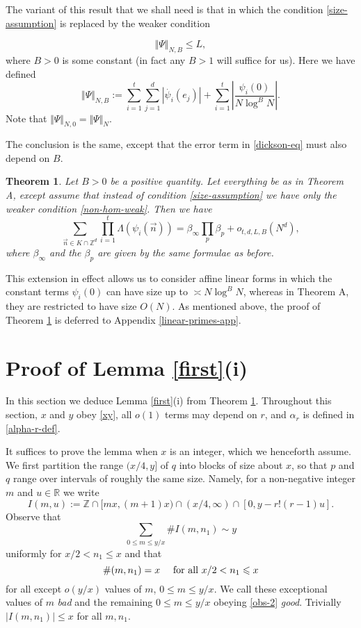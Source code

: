 \documentclass[12pt]{amsart}
\numberwithin{equation}{section}  %
\theoremstyle{remark}
\theoremstyle{plain}
\newtheorem{thm}{Theorem}
\numberwithin{equation}{section}
\newcommand{\Z}{\mathbb{Z}}
\newcommand{\R}{\mathbb{R}}
\renewcommand{\le}{\leqslant}
\renewcommand{\leq}{\leqslant}
\renewcommand{\(}{\left(}
\renewcommand{\)}{\right)}
\newcommand{\asym}{\sim}   %
\newcommand{\vect}[1]{{\ensuremath{\vec{#1}}}}
\begin{document}
The variant of this result that we shall need is that in which the condition \eqref{size-assumption} is replaced by the weaker condition 

\begin{equation}\label{non-hom-weak} \Vert \Psi \Vert_{N,B} \leq L, \end{equation}
where $B > 0$ is some constant (in fact any $B > 1$ will suffice for us). Here we have defined
\[ \Vert \Psi \Vert_{N,B} := \sum_{i=1}^t \sum_{j = 1}^d |\dot{\psi_i}(e_j)|  + \sum_{i = 1}^t \left|\frac{\psi_i(0)}{N\log^B N}\right|.\] Note that $\Vert \Psi \Vert_{N,0} = \Vert \Psi \Vert_N$.

 The conclusion is the same, except that the error term in \eqref{dickson-eq} must also depend on $B$.


\begin{thm}\label{dickson-shifted}
Let $B > 0$ be a positive quantity. Let everything be as in Theorem A, 
except assume that instead of condition \eqref{size-assumption} we have only the weaker condition \eqref{non-hom-weak}. Then we have
\[
\sum_{ \vect{n} \in K \cap \Z^d} \prod_{i=1}^t \Lambda( \psi_i(\vect{n}) ) = \beta_\infty \prod_p \beta_p + o_{t,d,L,B}(N^d),
\]
where $\beta_{\infty}$ and the $\beta_p$ are given by the same formulae as before.
\end{thm}

This extension in effect allows us to consider affine linear forms in
which the constant terms $\psi_i(0)$ can have size up to $\asymp N
\log^B N$, whereas in Theorem A, they are restricted to have size $O(N)$.  As mentioned above, the proof of Theorem \ref{dickson-shifted} is deferred to Appendix \ref{linear-primes-app}.



\section{Proof of Lemma \ref{first}(i)}\label{first-lemma-sec}

In this section we deduce Lemma \ref{first}(i) from Theorem \ref{dickson-shifted}. Throughout this section, $x$ and $y$ obey \eqref{xy}, all $o(1)$ terms may depend on $r$, and $\alpha_r$ is defined in \eqref{alpha-r-def}.

It suffices to prove the lemma when $x$ is an integer,
which we henceforth assume.
We first partition the range $(x/4,y]$ of $q$ into blocks of size about $x$, so that $p$ and
$q$ range over intervals of roughly the same size.
Namely, for a non-negative integer $m$ and $u \in \R$ we write
\[ I(m,u) := \Z \cap [mx, (m+1)x) \cap (x/4 , \infty) \cap [0, y - r!(r-1)u].\] Observe that
\begin{equation}\label{obs-1}
\sum_{0 \leq m \leq y/x} \# I(m,n_1) \asym y
\end{equation}
uniformly for $x/2 < n_1 \le x$ and that
\begin{equation}\label{obs-2} \# (m,n_1)= x \quad \hbox{ for all } x/2<n_1\le x
\end{equation} for all except $o(y/x)$ values of $m$, $0 \leq m \leq y/x$. We call these exceptional values of $m$ \emph{bad} and the remaining $0 \leq m \leq y/x$ obeying \eqref{obs-2} \emph{good}. Trivially $|I(m,n_1)| \leq x$ for all $m,n_1$.
\end{document}
